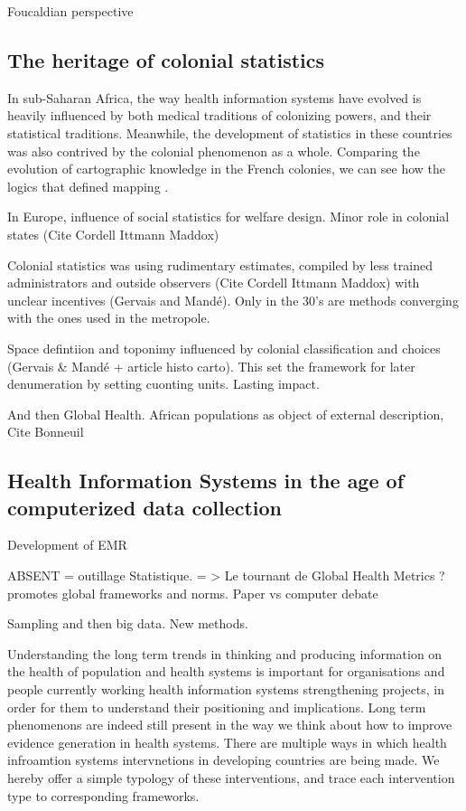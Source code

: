 Foucaldian perspective

\subsection{The heritage of colonial statistics}

In sub-Saharan Africa, the way health information systems have evolved is heavily influenced by both medical traditions of colonizing powers, and their statistical traditions. Meanwhile, the development of statistics in these countries was also contrived by the colonial phenomenon as a whole. Comparing the evolution of cartographic knowledge in the French colonies, we can see how the logics that defined mapping \cite{appadurai_number_1996}.

In Europe, influence of social statistics for welfare design. Minor role in colonial states (Cite Cordell Ittmann  Maddox)

Colonial statistics was using rudimentary estimates, compiled by less trained administrators and outside observers (Cite Cordell Ittmann  Maddox) with unclear incentives (Gervais and Mandé). Only in the 30's are methods converging with the ones used in the metropole.

Space defintiion and toponimy influenced by colonial classification and choices (Gervais & Mandé + article histo carto). This set the framework for later denumeration by setting cuonting units. Lasting impact.

And then Global Health. African populations as object of external description, Cite Bonneuil

\subsection{Health Information Systems in the age of computerized data collection}

Development of EMR

ABSENT = outillage Statistique. = > Le tournant de Global Health Metrics ? \cite{health_metrics_network_framework_2008} promotes global frameworks and norms.
Paper vs computer debate

Sampling and then big data. New methods.



Understanding the long term trends in thinking and producing information on the health of population and health systems is important for organisations and people currently working health information systems strengthening projects, in order for them to understand their positioning and implications. Long term phenomenons are indeed still present in the way we think about how to improve evidence generation in health systems. There are multiple ways in which health infroamtion systems intervnetions in developing countries are being made. We hereby offer a simple typology of these interventions, and trace each intervention type to corresponding frameworks.

